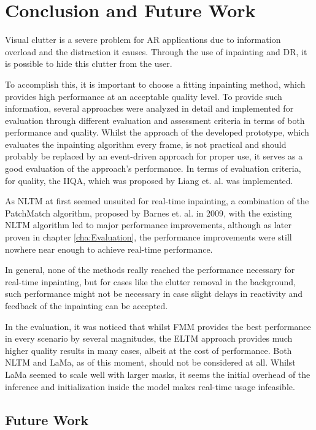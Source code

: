 \chapter{Conclusion and Future Work}
\label{cha:Conclusion}

Visual clutter is a severe problem for AR applications due to information overload and the distraction it causes. Through the use of inpainting and DR, it is possible to hide this clutter from the user. 

To accomplish this, it is important to choose a fitting inpainting method, which provides high performance at an acceptable quality level. To provide such information, several approaches were analyzed in detail and implemented for evaluation through different evaluation and assessment criteria in terms of both performance and quality.
Whilst the approach of the developed prototype, which evaluates the inpainting algorithm every frame, is not practical and should probably be replaced by an event-driven approach for proper use, it serves as a good evaluation of the approach's performance. In terms of evaluation criteria, for quality, the IIQA, which was proposed by Liang et. al. \cite{Liang2019InpaintingQuality} was implemented.

As NLTM at first seemed unsuited for real-time inpainting, a combination of the PatchMatch algorithm, proposed by Barnes et. al. in 2009\cite{BarnesConnelly2009Parc}, with the existing NLTM algorithm led to major performance improvements, although as later proven in chapter \ref{cha:Evaluation}, the performance improvements were still nowhere near enough to achieve real-time performance.

In general, none of the methods really reached the performance necessary for real-time inpainting, but for cases like the clutter removal in the background, such performance might not be necessary in case slight delays in reactivity and feedback of the inpainting can be accepted.

In the evaluation, it was noticed that whilst FMM provides the best performance in every scenario by several magnitudes, the ELTM approach provides much higher quality results in many cases, albeit at the cost of performance. Both NLTM and LaMa, as of this moment, should not be considered at all.
Whilst LaMa seemed to scale well with larger masks, it seems the initial overhead of the inference and initialization inside the model makes real-time usage infeasible.

\section{Future Work}

